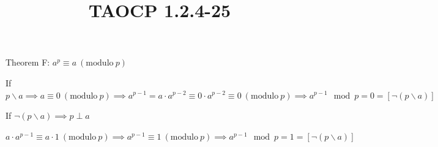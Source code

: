 \documentclass{article}
\title{TAOCP 1.2.4\mbox{-}25}
\begin{document}
\maketitle

Theorem F\@: \( a^{p} \equiv a\ (\mathrm{modulo}\ p) \)

If \( p \backslash a \implies a \equiv 0\ (\mathrm{modulo}\ p) \implies a^{p-1} = a \cdot a^{p-2} \equiv 0 \cdot a^{p-2} \equiv 0\ (\mathrm{modulo}\ p) \implies a^{p-1} \mod p = 0 = [\lnot(p \backslash a)] \)

If \( \lnot(p \backslash a) \implies p \perp a \)

\( a \cdot a^{p-1} \equiv a \cdot 1\ (\mathrm{modulo}\ p) \implies a^{p-1}\equiv 1\ (\mathrm{modulo}\ p) \implies a^{p-1} \mod p = 1 = [\lnot(p \backslash a)] \)
\end{document}
